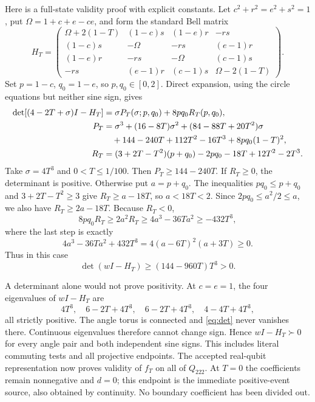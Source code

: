 \documentclass[11pt]{article}
\begin{document}
Here is a full-state validity proof with explicit constants. Let
$c^2+r^2=e^2+s^2=1$, put $\Omega=1+c+e-ce$, and form the standard Bell matrix
\begin{equation}\label{eq:bell}
H_T=\begin{pmatrix}
\Omega+2(1-T)&(1-c)s&(1-e)r&-rs\\
(1-c)s&-\Omega&-rs&(e-1)r\\
(1-e)r&-rs&-\Omega&(c-1)s\\
-rs&(e-1)r&(c-1)s&\Omega-2(1-T)
\end{pmatrix}.
\end{equation}
Set $p=1-c$, $q_0=1-e$, so $p,q_0\in[0,2]$. Direct expansion, using the
circle equations but neither sine sign, gives
\begin{align}
\det[(4-2T+\sigma)I-H_T]&=\sigma P_T(\sigma;p,q_0)+8pq_0R_T(p,q_0),\label{eq:det}\\
P_T&=\sigma^3+(16-8T)\sigma^2+(84-88T+20T^2)\sigma\notag\\
&\quad+144-240T+112T^2-16T^3+8pq_0(1-T)^2,\notag\\
R_T&=(3+2T-T^2)(p+q_0)-2pq_0-18T+12T^2-2T^3.\notag
\end{align}
Take $\sigma=4T^3$ and $0<T\leq1/100$. Then $P_T\geq144-240T$.
If $R_T\geq0$, the determinant is positive. Otherwise put $a=p+q_0$.
The inequalities $pq_0\leq p+q_0$ and $3+2T-T^2\geq3$ give
$R_T\geq a-18T$, so $a<18T<2$. Since
$2pq_0\leq a^2/2\leq a$, we also have $R_T\geq2a-18T$.
Because $R_T<0$,
\[
8pq_0R_T\geq2a^2R_T\geq4a^3-36Ta^2\geq-432T^3,
\]
where the last step is exactly
\[
4a^3-36Ta^2+432T^3=4(a-6T)^2(a+3T)\geq0.
\]
Thus in this case
\begin{equation}\label{eq:positive-det}
\det(wI-H_T)\geq(144-960T)T^3>0.
\end{equation}

A determinant alone would not prove positivity. At $c=e=1$, the four
eigenvalues of $wI-H_T$ are
\[
4T^3,\quad6-2T+4T^3,\quad6-2T+4T^3,\quad4-4T+4T^3,
\]
all strictly positive. The angle torus is connected and \eqref{eq:det}
never vanishes there. Continuous eigenvalues therefore cannot change sign.
Hence $wI-H_T\succ0$ for every angle pair and both independent sine signs.
This includes literal commuting tests and all projective endpoints.
The accepted real-qubit representation now proves validity of $f_T$ on
all of $Q_{222}$. At $T=0$ the coefficients remain nonnegative and $d=0$;
this endpoint is the immediate positive-event source, also obtained by
continuity. No boundary coefficient has been divided out.
\end{document}
